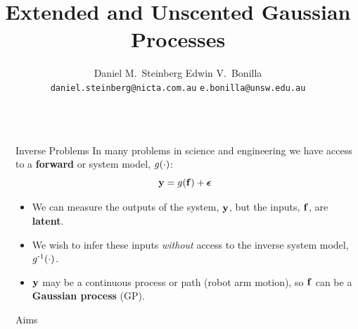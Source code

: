\documentclass[final]{beamer}
\title{Extended and Unscented Gaussian Processes} %
\author{Daniel M.\ Steinberg
 \qquad \qquad    
       Edwin V.\ Bonilla \\
   \texttt{\small{daniel.steinberg@nicta.com.au}} \hspace{4.7cm}
        \texttt{\small{e.bonilla@unsw.edu.au}}
} %
\institute{\vspace{-0.5cm}
 \hspace{4.5cm} NICTA  \hspace{7cm} The University of New South Wales
} %
\newlength{\sepwid}
\newlength{\onecolwid}
\begin{document}


\begin{frame}[t] %

\begin{columns}[t] %

\begin{column}{\sepwid}\end{column} %

\begin{column}{\onecolwid} %



\begin{alertblock}{Inverse Problems}
In many problems in science and engineering we have access to a \textbf{forward} or system
model, $g\!\left({{\cdot}}\right)$:
\begin{equation*}
    \mathbf{y} = g\!\left({{\mathbf{f}}}\right) + \boldsymbol\epsilon
\end{equation*}
\vspace{-2cm}
\begin{itemize}
    \item We can measure the outputs of the system, $\mathbf{y}$, but the inputs,
        $\mathbf{f}$, are \textbf{latent}.
    \item We wish to infer these inputs \emph{without} access to the inverse
        system model, $g^{\text{-}1}\!\left({{\cdot}}\right)$.
    \item $\mathbf{y}$ may be a continuous process or path (robot arm motion), 
        so $\mathbf{f}$ can be a  \textbf{Gaussian process} (GP).
\end{itemize}

\end{alertblock}


\begin{block}{Aims}


\end{block}
\end{column}
\end{columns}
\end{frame}
\end{document}
